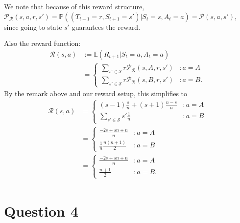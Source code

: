 \documentclass{article}
\begin{document}
We note that because of this reward structure, $\mathcal{P_{\mathcal{R}}}(s, a, r, s') = \mathbb{P}((T_{t + 1} = r, S_{t + 1} = s')| S_t = s, A_t = a) = \mathcal{P}(s, a, s')$, since going to state $s'$ guarantees the reward. 

Also the reward function:
\begin{align*}
	\mathcal{R}(s, a) & := \mathbb{E}(R_{t + 1}| S_t = a, A_t = a)\\
	&= \begin{cases}
		\sum_{s'\in \mathcal{S}}r\mathcal{P}_{\mathcal{R}}(s, A, r, s')&: a = A\\
		\sum_{s'\in \mathcal{S}} r\mathcal{P}_{\mathcal{R}}(s, B, r, s')&: a = B.
	\end{cases}
\end{align*}
By the remark above and our reward setup, this simplifies to
\begin{align*}
	\mathcal{R}(s, a) &= \begin{cases}
		(s - 1)\frac{s}{n} + (s + 1)\frac{n - s}{n} &: a = A\\
		\sum_{s'\in \mathcal{S}} s'\frac{1}{n} &: a = B
	\end{cases}\\
	&= \begin{cases}
		\frac{-2s+ sn + n}{n} &: a = A\\
		\frac{1}{n}\frac{n(n + 1)}{2} &: a = B
	\end{cases}\\
	&= \begin{cases}
		\frac{-2s+ sn + n}{n} &: a = A\\
		\frac{n + 1}{2} &: a = B.
	\end{cases}\\
\end{align*}
\section*{Question 4}
\end{document}
